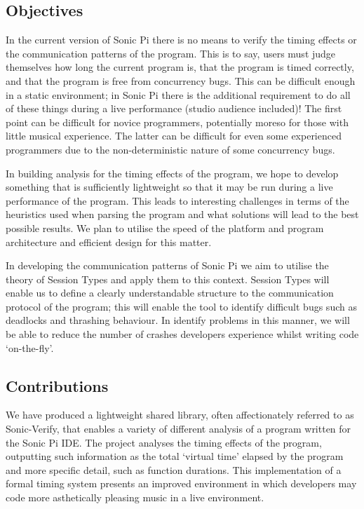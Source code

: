 \documentclass[11pt, abstracton, twoside, titlepage=true]{scrartcl}
\begin{document}
\subsection{Objectives}
In the current version of Sonic Pi there is no means to verify the timing effects
or the communication patterns of the program. This is to say, users must judge
themselves how long the current program is, that the program is timed correctly,
and that the program is free from concurrency bugs. This can be difficult enough 
in a static environment; in Sonic Pi there is the additional requirement to do 
all of these things during a live performance (studio audience included)! The 
first point can be difficult for novice programmers, potentially moreso for 
those with little musical experience. The latter can be difficult for even some 
experienced programmers due to the non-deterministic nature of some concurrency 
bugs.

In building analysis for the timing effects of the program, we hope to develop
something that is sufficiently lightweight so that it may be run during a live 
performance of the program. This leads to interesting challenges in terms of the 
heuristics used when parsing the program and what solutions will lead to the best 
possible results. We plan to utilise the speed of the platform and program 
architecture and efficient design for this matter.

In developing the communication patterns of Sonic Pi we aim to utilise the
theory of Session Types and apply them to this context. Session Types will
enable us to define a clearly understandable structure to the communication
protocol of the program; this will enable the tool to identify difficult bugs
such as deadlocks and thrashing behaviour. In identify problems in this manner,
we will be able to reduce the number of crashes developers experience whilst 
writing code `on-the-fly'.

\subsection{Contributions}
We have produced a lightweight shared library, often affectionately referred to 
as Sonic-Verify, that enables a variety of different analysis of a program 
written for the Sonic Pi IDE. The project analyses the timing effects of the 
program, outputting such information as the total `virtual time' elapsed by the 
program and more specific detail, such as function durations. This implementation
of a formal timing system presents an improved environment in which developers
may code more asthetically pleasing music in a live environment. 
\end{document}

